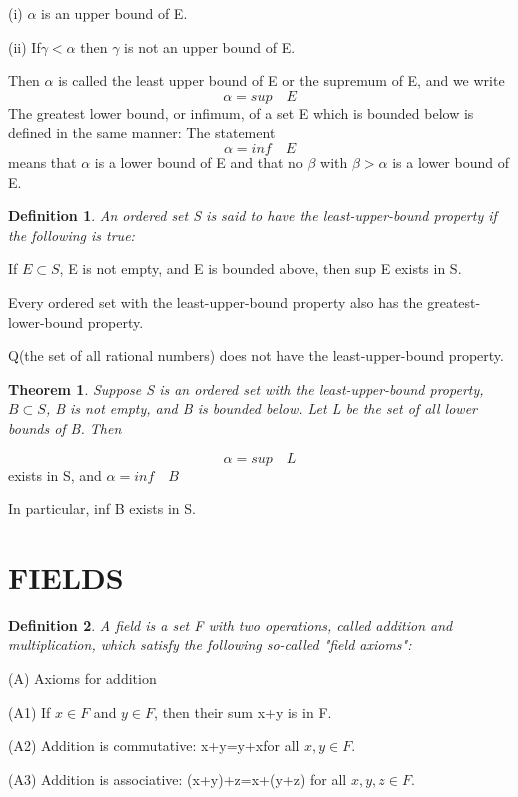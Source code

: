 \documentclass{article}
\newtheorem{defi}{Definition}
\newtheorem{theo}{Theorem}
\begin{document}
(i) $ \alpha $ is an upper bound of E.

(ii) If$ \gamma<\alpha $ then $ \gamma $ is not an upper bound of E.

Then $ \alpha $ is called the least upper bound of E or the supremum of E, and we write
\[
\alpha= sup\quad E
\]
The greatest lower bound, or infimum, of a set E which is bounded below is defined in the same manner: The statement
\[
\alpha= inf\quad E
\]
means that $ \alpha $ is a lower bound of E and that no $ \beta $ with $ \beta>\alpha $ is a lower bound of E.

\hspace*{\fill}

\begin{defi}
	 An ordered set S is said to have the least-upper-bound property if the following is true:
\end{defi}

If $ E\subset S $, E is not empty, and E is bounded above, then sup E exists in S.

\hspace*{\fill}

Every ordered set with the least-upper-bound property also has the greatest-lower-bound property.

Q(the set of all rational numbers) does not have the least-upper-bound property.

\begin{theo}
	Suppose S is an ordered set with the least-upper-bound property, $ B\subset S $, B is not empty, and B is bounded below. Let L be the set of all lower bounds of B. Then
\end{theo}
\[
\alpha=sup\quad L
\]
exists in S, and $ \alpha=inf\quad B $

In particular, inf B exists in S.

\section{FIELDS}
\begin{defi}
	A field is a set F with two operations, called addition and multiplication, which satisfy the following so-called "field axioms":
\end{defi}
(A) Axioms for addition

(A1) If $ x\in F $ and $ y\in F $, then their sum x+y is in F.

(A2) Addition is commutative: x+y=y+xfor all $ x,y\in F $.

(A3) Addition is associative: (x+y)+z=x+(y+z) for all $ x,y,z\in F $.
\end{document}
